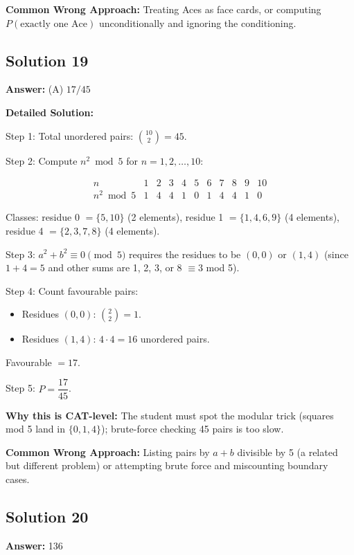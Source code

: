 \documentclass[11pt,a4paper]{article}
\begin{document}
\textbf{Common Wrong Approach:} Treating Aces as face cards, or computing \(P(\text{exactly one Ace})\) unconditionally and ignoring the conditioning.

\subsection*{Solution 19}
\textbf{Answer:} (A) \(17/45\)

\textbf{Detailed Solution:}

Step 1: Total unordered pairs: \(\binom{10}{2} = 45\).

Step 2: Compute \(n^2 \bmod 5\) for \(n = 1, 2, \ldots, 10\):

\[
\begin{array}{c|cccccccccc}
n & 1 & 2 & 3 & 4 & 5 & 6 & 7 & 8 & 9 & 10 \\ \hline
n^2 \bmod 5 & 1 & 4 & 4 & 1 & 0 & 1 & 4 & 4 & 1 & 0
\end{array}
\]

Classes: residue 0 \(= \{5, 10\}\) (2 elements), residue 1 \(= \{1, 4, 6, 9\}\) (4 elements), residue 4 \(= \{2, 3, 7, 8\}\) (4 elements).

Step 3: \(a^2 + b^2 \equiv 0 \pmod 5\) requires the residues to be \((0, 0)\) or \((1, 4)\) (since \(1 + 4 = 5\) and other sums are 1, 2, 3, or 8 \(\equiv 3\) mod 5).

Step 4: Count favourable pairs:
\begin{itemize}[leftmargin=*,topsep=0pt,itemsep=0pt]
    \item Residues \((0, 0)\): \(\binom{2}{2} = 1\).
    \item Residues \((1, 4)\): \(4 \cdot 4 = 16\) unordered pairs.
\end{itemize}
Favourable \(= 17\).

Step 5: \(P = \dfrac{17}{45}\).

\textbf{Why this is CAT-level:} The student must spot the modular trick (squares mod 5 land in \(\{0, 1, 4\}\)); brute-force checking 45 pairs is too slow.

\textbf{Common Wrong Approach:} Listing pairs by \(a + b\) divisible by 5 (a related but different problem) or attempting brute force and miscounting boundary cases.

\subsection*{Solution 20}
\textbf{Answer:} 136
\end{document}
